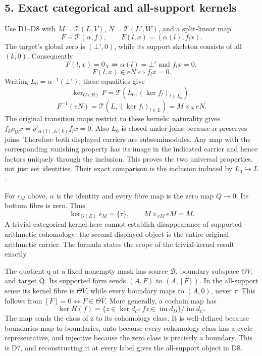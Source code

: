 \documentclass[10pt,a4paper,oneside]{report}
\begin{document}
\subsection{5. Exact categorical and all-support kernels}\label{proof01:source-maps-exact-categorical-and-all-support-kernels}

Use D1--D8 with \(M=\mathcal T(L,V)\), \(N=\mathcal T(L',W)\), and a split-linear map \[
F=\mathcal T(\alpha,f),\qquad F(l,x)=(\alpha(l),f_lx).
\] The target's global zero is \((\bot',0)\), while its support skeleton consists of all \((k,0)\). Consequently \[
F(l,x)=0_N\iff \alpha(l)=\bot'\text{ and }f_lx=0,
\] \[
F(l,x)\in eN\iff f_lx=0.
\] Writing \(L_0=\alpha^{-1}(\bot')\), these equalities give \[
\ker_{G(R)}F=\mathcal T(L_0,(\ker f_l)_{l\in L_0}),
\] \[
F^{-1}(eN)=\mathcal T(L,(\ker f_l)_{l\in L})
=M\times_N eN.
\] The original transition maps restrict to these kernels: naturality gives \(f_k\rho_{lk}x=\rho'_{\alpha(l),\alpha(k)}f_lx=0\). Also \(L_0\) is closed under joins because \(\alpha\) preserves joins. Therefore both displayed carriers are subsemimodules. Any map with the corresponding vanishing property has its image in the indicated carrier and hence factors uniquely through the inclusion. This proves the two universal properties, not just set identities. Their exact comparison is the inclusion induced by \(L_0\hookrightarrow L\).

For \(\epsilon_M\) above, \(\alpha\) is the identity and every fibre map is the zero map \(Q\to0\). Its bottom fibre is zero. Thus \[
\ker_{G(E)}\epsilon_M=\{\tau\},\qquad
M\times_{eM}eM=M.
\] A trivial categorical kernel here cannot establish disappearance of supported arithmetic cohomology: the second displayed object is the entire original arithmetic carrier. The formula states the scope of the trivial-kernel result exactly.

The quotient q at a fixed nonempty mask has source \(\mathscr B\), boundary subspace \(\Theta V\), and target Q. Its supported form sends \((A,F)\) to \((A,[F])\). In the all-support sense its kernel fibre is \(\Theta V\), while every boundary maps to \((A,0)\), never \(\tau\). This follows from \([F]=0\iff F\in\Theta V\). More generally, a cochain map has \[
\ker H(f)=\{z\in\ker d_C:fz\in\operatorname{im}d_D\}/\operatorname{im}d_C.
\] The map sends the class of z to its cohomology class. It is well-defined because boundaries map to boundaries, onto because every cohomology class has a cycle representative, and injective because the zero class is precisely a boundary. This is D7, and reconstructing it at every label gives the all-support object in D8.
\end{document}
